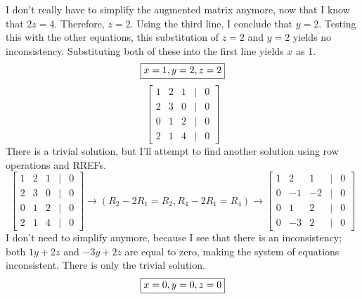 \documentclass[letterpaper]{report}
\begin{document}
I don't really have to simplify the augmented matrix anymore, now that I know that $2z = 4$. Therefore, $z = 2$.
Using the third line, I conclude that $y = 2$. Testing this with the other equations, this substitution of $z=2$ and $y=2$ yields no inconsistency. Substituting both of these into the first line yields $x$ as 1. 
\[
    \fbox{$x=1,y=2,z=2$}
\] 
\noindent\makebox[\linewidth]{\rule{\linewidth}{0.4pt}}
\[
\begin{bmatrix} 
    1 & 2 & 1 & | & 0 \\
    2 & 3 & 0 & | & 0 \\
    0 & 1 & 2 & | & 0 \\
    2 & 1 & 4 & | & 0
\end{bmatrix} 
\] There is a trivial solution, but I'll attempt to find another solution using row operations and RREFs. 
\[
\begin{bmatrix} 
    1 & 2 & 1 & | & 0 \\
    2 & 3 & 0 & | & 0 \\
    0 & 1 & 2 & | & 0 \\
    2 & 1 & 4 & | & 0
\end{bmatrix} \to 
(R_2 - 2R_1 = R_2, R_4 - 2R_1 = R_4) \to 
\begin{bmatrix} 
    1 & 2 & 1 & | & 0 \\
    0 & -1 & -2 & | & 0 \\
    0 & 1 & 2 & | & 0 \\
    0 & -3 & 2 & | & 0
\end{bmatrix} 
\]
I don't need to simplify anymore, because I see that there is an inconsistency; both $1y + 2z$ and $-3y + 2z$ are equal to zero, making the system of equations inconsistent. There is only the trivial solution. 
\[
    \fbox{$x=0,y=0,z=0$}
\] 
\end{document}
